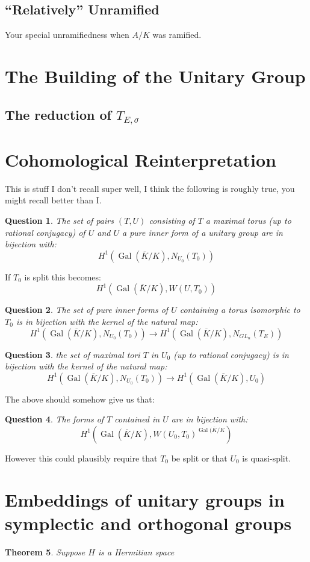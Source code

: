 \documentclass{article}
\theoremstyle{plain}
\newtheorem{theorem}{Theorem}[section]
\newtheorem{question}[theorem]{Question}
\theoremstyle{definition}
\numberwithin{equation}{section}
\DeclareMathOperator{\Gal}{Gal}
\begin{document}
\subsection{``Relatively'' Unramified}

Your special unramifiedness when $A/K$ was ramified.

\section{The Building of the Unitary Group}

\subsection{The reduction of $T_{E,\sigma}$}

\section{Cohomological Reinterpretation}

This is stuff I don't recall super well, I think the following is roughly true, you might recall better than I.

\begin{question}
The set of pairs $(T,U)$ consisting of $T$ a maximal torus (up to rational conjugacy) of $U$ and $U$ a pure inner form of a unitary group are in bijection with:
\[ H^1( \Gal(\overline{K}/K), N_{U_0}(T_0) ) \]
\end{question}
If $T_0$ is split this becomes:
\[ H^1( \Gal(\overline{K}/K), W(U,T_0) ) \]

\begin{question}
The set of pure inner forms of $U$ containing a torus isomorphic to $T_0$ is in bijection with the kernel of the natural map:
\[ H^1( \Gal(\overline{K}/K), N_{U_0}(T_0) ) \rightarrow H^1( \Gal(\overline{K}/K),N_{GL_n}(T_E )) \]
\end{question}

\begin{question}
the set of maximal tori $T$ in $U_0$ (up to rational conjugacy) is in bijection with the kernel of the natural map:
\[  H^1( \Gal(\overline{K}/K), N_{U_0}(T_0) ) \rightarrow H^1( \Gal(\overline{K}/K), U_0) \]
\end{question}

The above should somehow give us that:
\begin{question}
The forms of $T$ contained in $U$ are in bijection with:
\[ H^1(\Gal(\overline{K}/K), W(U_0,T_0)^{\Gal(\overline{K}/K} ) \]
\end{question}
However this could plausibly require that $T_0$ be split or that $U_0$ is quasi-split.




\section{Embeddings of unitary groups in symplectic and orthogonal groups}

\begin{theorem}
Suppose $H$ is a Hermitian space
\end{theorem}
\end{document}
